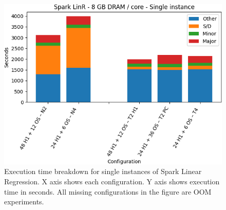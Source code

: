 \begin{figure}[thbp]

    \includegraphics[width=\linewidth]{./fig/linr128_single.png}
    \caption{Execution time breakdown for single instances of Spark
    Linear Regression. X axis shows each configuration.
Y axis shows execution time in seconds. All missing configurations in the figure are OOM experiments.}
    \label{fig:linr128_single}
\end{figure}

